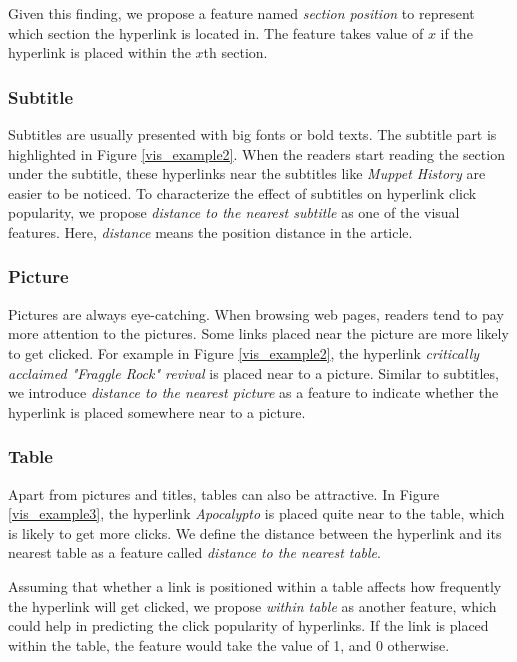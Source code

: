Given this finding, we propose a feature named \emph{section position} to represent which section the hyperlink is located in. The feature takes value of $x$ if the hyperlink is placed within the $x$th section. 

\subsubsection{Subtitle}

Subtitles are usually presented with big fonts or bold texts. The subtitle part is highlighted in Figure \ref{vis_example2}. When the readers start reading the section under the subtitle, these hyperlinks near the subtitles like \emph{Muppet History} are easier to be noticed. To characterize the effect of subtitles on hyperlink click popularity, we propose \emph{distance to the nearest subtitle} as one of the visual features. Here, \emph{distance} means the position distance in the article.

\subsubsection{Picture}

Pictures are always eye-catching. When browsing web pages, readers tend to pay more attention to the pictures. Some links placed near the picture are more likely to get clicked. For example in Figure \ref{vis_example2}, the hyperlink \emph{critically acclaimed "Fraggle Rock" revival} is placed near to a picture. Similar to subtitles, we introduce \emph{distance to the nearest picture} as a feature to indicate whether the hyperlink is placed somewhere near to a picture.
    
\subsubsection{Table}

Apart from pictures and titles, tables can also be attractive. In Figure \ref{vis_example3}, the hyperlink \emph{Apocalypto} is placed quite near to the table, which is likely to get more clicks. We define the distance between the hyperlink and its nearest table as a feature called \emph{distance to the nearest table}.

Assuming that whether a link is positioned within a table affects how frequently the hyperlink will get clicked, we propose \emph{within table} as another feature, which could help in predicting the click popularity of hyperlinks. If the link is placed within the table, the feature would take the value of 1, and 0 otherwise.

